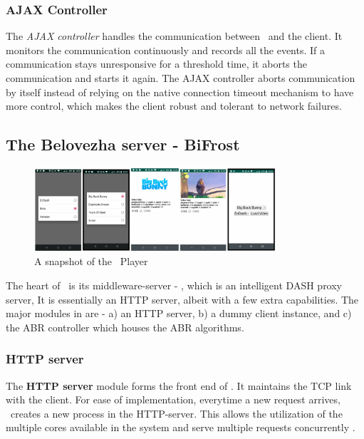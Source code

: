 \subsubsection{AJAX Controller}
The \textit{AJAX controller} handles the communication between \servname\ and the client. It monitors the communication continuously and records all the events. If a communication stays unresponsive for a threshold time, it aborts the communication and starts it again. The AJAX controller aborts communication by itself instead of relying on the native connection timeout mechanism to have more control, which makes the client robust and tolerant to network failures.
\subsection{The Belovezha server - BiFrost}
\begin{figure}[h]
    \centering
    \includegraphics[width=0.8\textwidth]{images/App_Specs.eps}
    \caption{A snapshot of the \bel\ Player}
    \label{fig:chap05:bel_client}
\end{figure}
 The heart of \bel\ is its middleware-server - \servname, which is an intelligent \ac{DASH} proxy server, It is essentially an HTTP server, albeit with a few extra capabilities. The major modules in \servname are -  a) an HTTP server,  b) a dummy client instance, and  c) the \ac{ABR} controller which houses the ABR algorithms.
\subsubsection{HTTP server}  
The \textbf{HTTP server} module forms the front end of \servname. It maintains the TCP link with the client. For ease of implementation, everytime a new request arrives, \servname\ creates a new process in the HTTP-server. This allows the utilization of the multiple cores available in the system and serve multiple requests concurrently .

